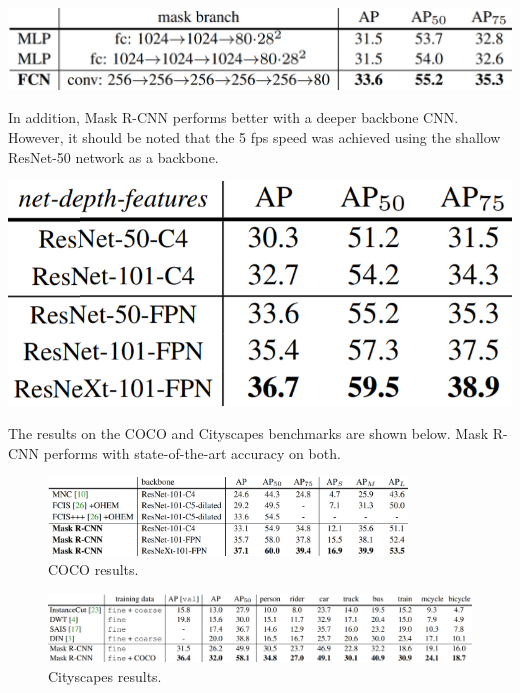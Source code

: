 \begin{center}
	\includegraphics[scale=0.4]{images/fcncomparison.PNG}
\end{center}

In addition, Mask R-CNN performs better with a deeper backbone CNN. However, it should be noted that the 5 fps speed was achieved using the shallow ResNet-50 network as a backbone.

\begin{center}
	\includegraphics[scale=0.4]{images/backbonecomparison.PNG}
\end{center}

The results on the COCO and Cityscapes benchmarks are shown below. Mask R-CNN performs with state-of-the-art accuracy on both.
\begin{figure}[htbp]
	\centering
	\includegraphics[width=0.85\textwidth]{images/cocoresults.PNG} %
	\caption{COCO results.}
\end{figure}
\begin{figure}[htbp]
	\centering
	\includegraphics[width=1\textwidth]{images/cityscapesresults.PNG} %
	\caption{Cityscapes results.}
\end{figure}


